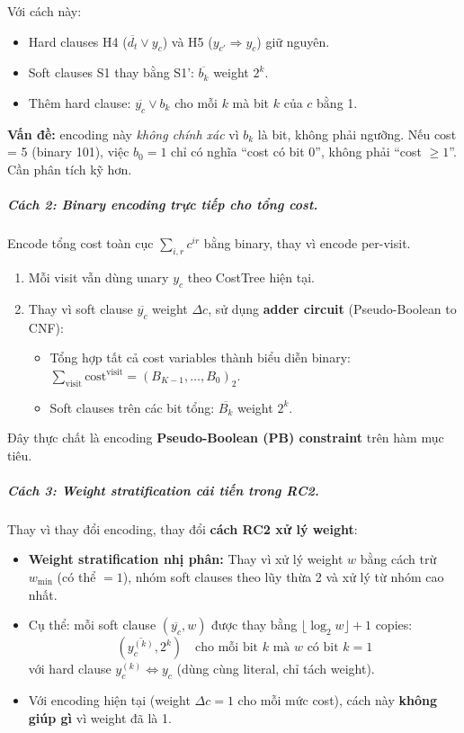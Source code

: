 \documentclass[11pt,a4paper]{article}
\begin{document}
Với cách này:
\begin{itemize}
  \item Hard clauses H4 ($\overline{d_t} \vee y_c$) và H5 ($y_{c'} \Rightarrow y_c$) giữ nguyên.
  \item Soft clauses S1 thay bằng S1': $\overline{b_k}$ weight $2^k$.
  \item Thêm hard clause: $\overline{y_c} \vee b_k$ cho mỗi $k$ mà bit $k$ của $c$ bằng 1.
\end{itemize}

\textbf{Vấn đề:} encoding này \emph{không chính xác} vì $b_k$ là bit, không phải ngưỡng. Nếu cost = 5 (binary 101), việc $b_0 = 1$ chỉ có nghĩa ``cost có bit 0'', không phải ``cost $\geq 1$''. Cần phân tích kỹ hơn.

\subparagraph{Cách 2: Binary encoding trực tiếp cho tổng cost.}

Encode tổng cost toàn cục $\sum_{i,r} c^{ir}$ bằng binary, thay vì encode per-visit.

\begin{enumerate}
  \item Mỗi visit vẫn dùng unary $y_c$ theo CostTree hiện tại.
  \item Thay vì soft clause $\overline{y_c}$ weight $\Delta c$, sử dụng \textbf{adder circuit} (Pseudo-Boolean to CNF):
  \begin{itemize}
    \item Tổng hợp tất cả cost variables thành biểu diễn binary: $\sum_{\text{visit}} \text{cost}^{\text{visit}} = (B_{K-1}, \ldots, B_0)_2$.
    \item Soft clauses trên các bit tổng: $\overline{B_k}$ weight $2^k$.
  \end{itemize}
\end{enumerate}

Đây thực chất là encoding \textbf{Pseudo-Boolean (PB) constraint} trên hàm mục tiêu.

\subparagraph{Cách 3: Weight stratification cải tiến trong RC2.}

Thay vì thay đổi encoding, thay đổi \textbf{cách RC2 xử lý weight}:

\begin{itemize}
  \item \textbf{Weight stratification nhị phân:} Thay vì xử lý weight $w$ bằng cách trừ $w_{\min}$ (có thể $= 1$), nhóm soft clauses theo lũy thừa 2 và xử lý từ nhóm cao nhất.
  \item Cụ thể: mỗi soft clause $(\overline{y_c}, w)$ được thay bằng $\lfloor \log_2 w \rfloor + 1$ copies:
    \[
    (\overline{y_c^{(k)}}, 2^k) \quad \text{cho mỗi bit } k \text{ mà } w \text{ có bit } k = 1
    \]
    với hard clause $y_c^{(k)} \Leftrightarrow y_c$ (dùng cùng literal, chỉ tách weight).
  \item Với encoding hiện tại (weight $\Delta c = 1$ cho mỗi mức cost), cách này \textbf{không giúp gì} vì weight đã là 1.
\end{itemize}
\end{document}
